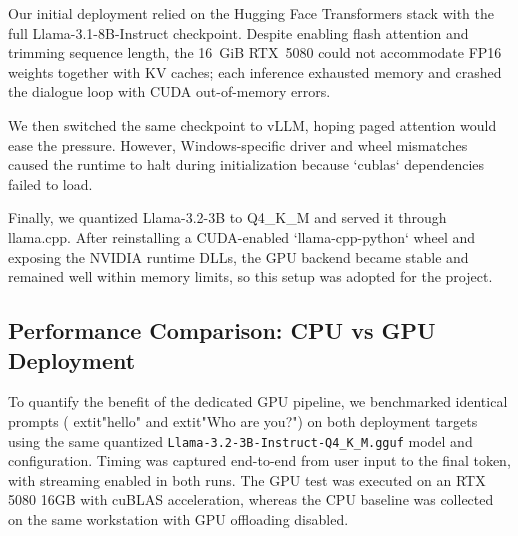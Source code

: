 \documentclass[12pt,a4paper]{article}
\begin{document}
Our initial deployment relied on the Hugging Face Transformers stack with the full Llama-3.1-8B-Instruct checkpoint. Despite enabling flash attention and trimming sequence length, the 16~GiB RTX~5080 could not accommodate FP16 weights together with KV caches; each inference exhausted memory and crashed the dialogue loop with CUDA out-of-memory errors.

We then switched the same checkpoint to vLLM, hoping paged attention would ease the pressure. However, Windows-specific driver and wheel mismatches caused the runtime to halt during initialization because `cublas` dependencies failed to load.

Finally, we quantized Llama-3.2-3B to Q4\_K\_M and served it through llama.cpp. After reinstalling a CUDA-enabled `llama-cpp-python` wheel and exposing the NVIDIA runtime DLLs, the GPU backend became stable and remained well within memory limits, so this setup was adopted for the project.



\subsection{Performance Comparison: CPU vs GPU Deployment}

To quantify the benefit of the dedicated GPU pipeline, we benchmarked identical prompts (	extit{"hello"} and 	extit{"Who are you?"}) on both deployment targets using the same quantized \texttt{Llama-3.2-3B-Instruct-Q4\_K\_M.gguf} model and configuration. Timing was captured end-to-end from user input to the final token, with streaming enabled in both runs. The GPU test was executed on an RTX 5080 16GB with cuBLAS acceleration, whereas the CPU baseline was collected on the same workstation with GPU offloading disabled.
\end{document}
